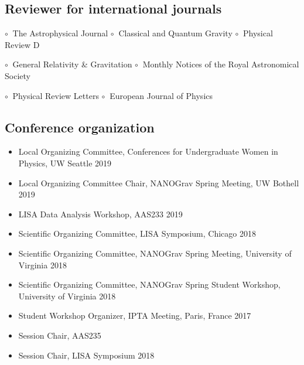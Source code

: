 \documentclass[11pt,letterpaper,sans,unicode]{moderncv}
\newcommand{\confitem}[2]{\item #1 \hfill #2} %
\newcommand{\blucirc}{{\color{color1} $\circ\;\;$}}
\begin{document}
\subsection{Reviewer for international journals}
\hspace{0.5mm} \blucirc The Astrophysical Journal  \hfill \blucirc Classical and Quantum Gravity \hfill \hspace{-0.2cm} \blucirc Physical Review D

\hspace{0.5mm} \blucirc General Relativity \& Gravitation  \hfill \blucirc Monthly Notices of the Royal Astronomical Society

\hspace{0.5mm} \blucirc Physical Review Letters  \hfill \blucirc European Journal of Physics


\subsection{Conference organization}
	\begin{itemize}[leftmargin=8mm]
	\confitem{Local Organizing Committee, Conferences for Undergraduate Women in Physics, UW Seattle}{2019}
	\confitem{Local Organizing Committee Chair, NANOGrav Spring Meeting, UW Bothell}{2019}
	\confitem{LISA Data Analysis Workshop, AAS233}{2019}
	\confitem{Scientific Organizing Committee, LISA Symposium, Chicago}{2018}
	\confitem{Scientific Organizing Committee, NANOGrav Spring Meeting, University of Virginia}{2018}
	\confitem{Scientific Organizing Committee, NANOGrav Spring Student Workshop, University of Virginia}{2018}
    	\confitem{Student Workshop Organizer, IPTA Meeting, Paris, France}{2017}
	\confitem{Session Chair, AAS235}
	\confitem{Session Chair, LISA Symposium 2018}
	\end{itemize}
\end{document}
